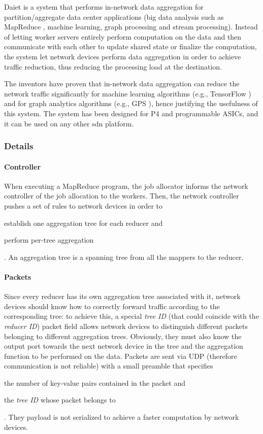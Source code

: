 Daiet \cite{daiet} is a system that performs in-network data aggregation for partition/aggregate data center applications (big data analysis such as MapReduce \cite{mapreduce}, machine learning, graph processing and stream processing).
Instead of letting worker servers entirely perform computation on the data and then communicate with each other to update shared state or finalize the computation, the system let network devices perform data aggregation in order to achieve traffic reduction, thus reducing the processing load at the destination.\par
The inventors have proven that in-network data aggregation can reduce the network traffic significantly for machine learning algorithms (e.g., TensorFlow \cite{tensorflow}) and for graph analytics algorithms (e.g., GPS \cite{gps}), hence justifying the usefulness of this system. The system has been designed for P4 \cite{p4} and programmable ASICs, and it can be used on any other \gls{sdn} platform.

\subsubsection{Details}
\paragraph{Controller}
When executing a MapReduce program, the job allocator informs the network controller of the job allocation to the workers.
Then, the network controller pushes a set of rules to network devices in order to
\begin{mylist}
    \item establish one aggregation tree for each reducer and
    \item perform per-tree aggregation
\end{mylist}.
An aggregation tree is a spanning tree from all the mappers to the reducer.
\paragraph{Packets}
Since every reducer has its own aggregation tree associated with it, network devices should know how to correctly forward traffic according to the corresponding tree: to achieve this, a special \textit{tree ID} (that could coincide with the \textit{reducer ID}) packet field allows network devices to distinguish different packets belonging to different aggregation trees.
Obviously, they must also know the output port towards the next network device in the tree and the aggregation function to be performed on the data.
Packets are sent via UDP (therefore communication is not reliable) with a small preamble that specifies
\begin{mylist}
    \item the number of key-value pairs contained in the packet and
    \item the \textit{tree ID} whose packet belongs to
\end{mylist}. They payload is not serialized to achieve a faster computation by network devices.

